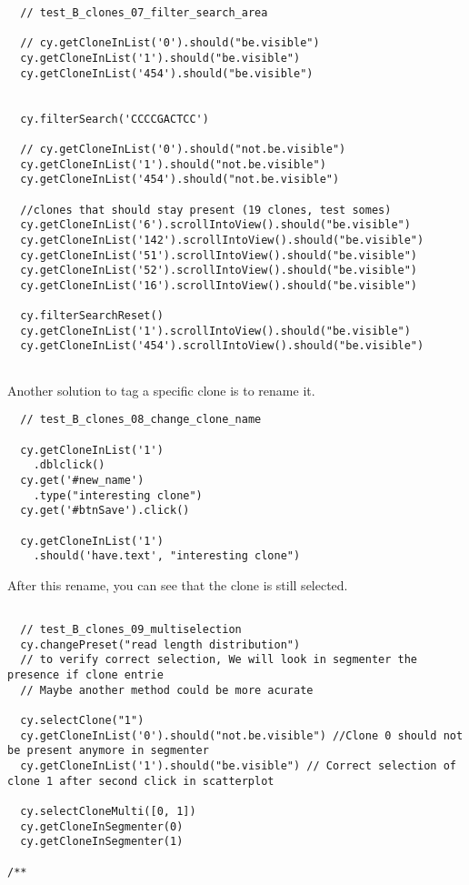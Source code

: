 \begin{verbatim}
  // test_B_clones_07_filter_search_area

  // cy.getCloneInList('0').should("be.visible")
  cy.getCloneInList('1').should("be.visible")
  cy.getCloneInList('454').should("be.visible")


  cy.filterSearch('CCCCGACTCC')

  // cy.getCloneInList('0').should("not.be.visible")
  cy.getCloneInList('1').should("not.be.visible")
  cy.getCloneInList('454').should("not.be.visible")

  //clones that should stay present (19 clones, test somes)
  cy.getCloneInList('6').scrollIntoView().should("be.visible")
  cy.getCloneInList('142').scrollIntoView().should("be.visible")
  cy.getCloneInList('51').scrollIntoView().should("be.visible")
  cy.getCloneInList('52').scrollIntoView().should("be.visible")
  cy.getCloneInList('16').scrollIntoView().should("be.visible")

  cy.filterSearchReset()
  cy.getCloneInList('1').scrollIntoView().should("be.visible")
  cy.getCloneInList('454').scrollIntoView().should("be.visible")


\end{verbatim}  
\bigskip

Another solution to tag a specific clone is to rename it.
\begin{verbatim}
  // test_B_clones_08_change_clone_name

  cy.getCloneInList('1')
    .dblclick()
  cy.get('#new_name')
    .type("interesting clone")
  cy.get('#btnSave').click()

  cy.getCloneInList('1')
    .should('have.text', "interesting clone")

\end{verbatim}

\bigskip

After this rename, you can see that the clone is still selected.
\begin{verbatim}

  // test_B_clones_09_multiselection
  cy.changePreset("read length distribution")
  // to verify correct selection, We will look in segmenter the presence if clone entrie
  // Maybe another method could be more acurate

  cy.selectClone("1")
  cy.getCloneInList('0').should("not.be.visible") //Clone 0 should not be present anymore in segmenter
  cy.getCloneInList('1').should("be.visible") // Correct selection of clone 1 after second click in scatterplot

  cy.selectCloneMulti([0, 1])
  cy.getCloneInSegmenter(0)
  cy.getCloneInSegmenter(1)

/**
\end{verbatim}

